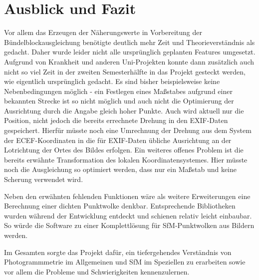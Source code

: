 \documentclass[./00PhotoBox.tex]{subfiles}
\begin{document}
\chapter{Ausblick und Fazit}
Vor allem das Erzeugen der Näherungswerte in Vorbereitung der Bündelblockausgleich\-ung benötigte deutlich mehr Zeit und Theorieverständnis als gedacht. Daher wurde leider nicht alle ursprünglich geplanten Features umgesetzt. Aufgrund von Krankheit und anderen Uni-Projekten konnte dann zusätzlich auch nicht so viel Zeit in der zweiten Semesterhälfte in das Projekt gesteckt werden, wie eigentlich ursprünglich gedacht. Es sind bisher beispielsweise keine Nebenbedingungen möglich - ein Festlegen eines Maßstabes aufgrund einer bekannten Strecke ist so nicht möglich und auch nicht die Optimierung der Ausrichtung durch die Angabe gleich hoher Punkte. Auch wird aktuell nur die Position, nicht jedoch die bereits errechnete Drehung in den EXIF-Daten gespeichert. Hierfür müsste noch eine Umrechnung der Drehung aus dem System der ECEF-Koordinaten in die für EXIF-Daten übliche Ausrichtung an der Lotrichtung der Ortes des Bildes erfolgen. Ein weiteres offenes Problem ist die bereits erwähnte Transformation des lokalen Koordinatensystemes. Hier müsste noch die Ausgleichung so optimiert werden, dass nur ein Maßstab und keine Scherung verwendet wird.

Neben den erwähnten fehlenden Funktionen wäre als weitere Erweiterungen eine Berechnung einer dichten Punktwolke denkbar. Entsprechende Bibliotheken wurden währ\-end der Entwicklung entdeckt und schienen relativ leicht einbaubar. So würde die Software zu einer Komplettlösung für \gls{SfM}-Punktwolken aus Bildern werden.

Im Gesamten sorgte das Projekt dafür, ein tiefergehendes Verständnis von Photogrammmetrie im Allgemeinen und \gls{SfM} im Speziellen zu erarbeiten sowie vor allem die Probleme und Schwierigkeiten kennenzulernen.

\biblio
\end{document}
